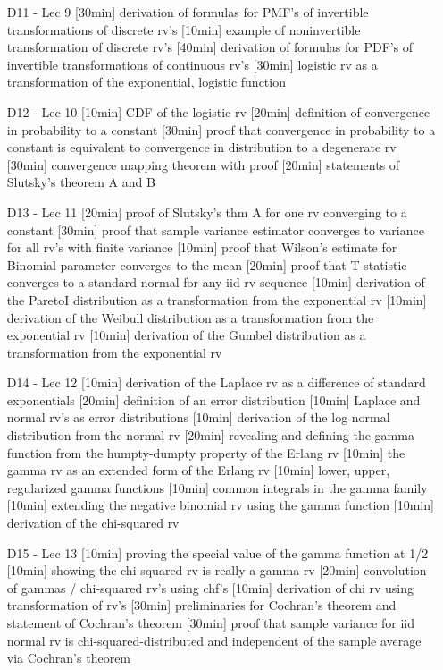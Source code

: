 \begin{enumerate}
\item[D11 - Lec 9] [30min] derivation of formulas for PMF's of invertible transformations of discrete rv's [10min] example of noninvertible transformation of discrete rv's [40min] derivation of formulas for PDF's of invertible transformations of continuous rv's [30min] logistic rv as a transformation of the exponential, logistic function

\item[D12 - Lec 10] [10min] CDF of the logistic rv [20min] definition of convergence in probability to a constant [30min] proof that convergence in probability to a constant is equivalent to convergence in distribution to a degenerate rv [30min] convergence mapping theorem with proof [20min] statements of Slutsky's theorem A and B

\item[D13 - Lec 11]  [20min] proof of Slutsky's thm A for one rv converging to a constant [30min] proof that sample variance estimator converges to variance for all rv's with finite variance [10min] proof that Wilson's estimate for Binomial parameter converges to the mean [20min] proof that T-statistic converges to a standard normal for any iid rv sequence [10min] derivation of the ParetoI distribution as a transformation from the exponential rv [10min] derivation of the Weibull distribution as a transformation from the exponential rv [10min] derivation of the Gumbel distribution as a transformation from the exponential rv 

\item[D14 - Lec 12] [10min] derivation of the Laplace rv as a difference of standard exponentials [20min] definition of an error distribution [10min] Laplace and normal rv's as error distributions [10min] derivation of the log normal distribution from the normal rv [20min] revealing and defining the gamma function from the humpty-dumpty property of the Erlang rv [10min] the gamma rv as an extended form of the Erlang rv [10min] lower, upper, regularized gamma functions [10min] common integrals in the gamma family [10min] extending the negative binomial rv using the gamma function [10min] derivation of the chi-squared rv

\item[D15 - Lec 13] [10min] proving the special value of the gamma function at 1/2 [10min] showing the chi-squared rv is really a gamma rv [20min] convolution of gammas / chi-squared rv's using chf's [10min] derivation of chi rv using transformation of rv's [30min] preliminaries for Cochran's theorem and statement of Cochran's theorem [30min] proof that sample variance for iid normal rv is chi-squared-distributed and independent of the sample average via Cochran's theorem 


\end{enumerate}
